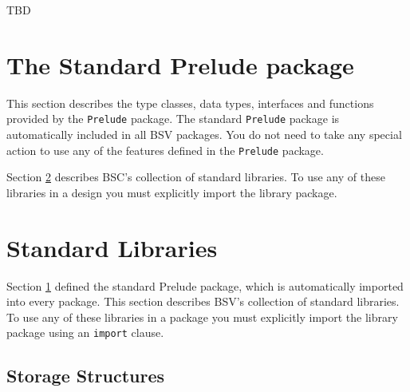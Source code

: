 \documentclass{article}
\newcommand{\BSV}{BSV}
\newcommand{\te}[1]{\texttt{#1}}
\begin{document}
TBD


\clearpage

\section{The Standard Prelude package}

\label{sec-prelude}
\label{lib-prelude}

This section describes the type classes, data types, interfaces and
functions  provided by the \te{Prelude} package.
The standard \te{Prelude} package is automatically included in all BSV
packages.   You do not  need to take any special
action to use any of the features defined in the \te{Prelude} package.


Section {\ref{sec-additional-libs}} describes BSC's collection
of standard libraries.  To use any of these libraries in a
design you must explicitly import the library package.




\clearpage

\section{Standard Libraries}
\label{sec-additional-libs}

Section {\ref{sec-prelude}} defined the standard Prelude package,
which is automatically imported into every package.  This section
describes {\BSV}'s collection of standard libraries.
To use any of these libraries in a package you must
explicitly import the library package using an \texttt{import}
clause.


\subsection{Storage Structures}











\end{document}
